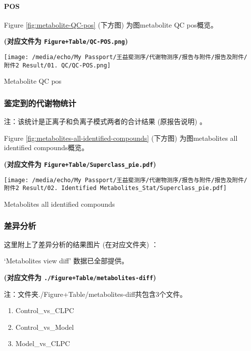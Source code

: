 \documentclass[
]{article}
\providecommand{\tightlist}{%
  \setlength{\itemsep}{0pt}\setlength{\parskip}{0pt}}
\begin{document}
\hypertarget{pos}{%
\paragraph{POS}\label{pos}}

Figure \ref{fig:metabolite-QC-pos} (下方图) 为图metabolite QC pos概览。

\textbf{(对应文件为 \texttt{Figure+Table/QC-POS.png})}

\def\@captype{figure}
\begin{center}
\texttt{[image: /media/echo/My Passport/王益斐测序/代谢物测序/报告与附件/报告及附件/附件2 Result/01. QC/QC-POS.png]}
\caption{Metabolite QC pos}\label{fig:metabolite-QC-pos}
\end{center}

\hypertarget{ux9274ux5b9aux5230ux7684ux4ee3ux8c22ux7269ux7edfux8ba1}{%
\subsubsection{鉴定到的代谢物统计}\label{ux9274ux5b9aux5230ux7684ux4ee3ux8c22ux7269ux7edfux8ba1}}

注：该统计是正离子和负离子模式两者的合计结果 (原报告说明) 。

Figure \ref{fig:metabolites-all-identified-compounds} (下方图) 为图metabolites all identified compounds概览。

\textbf{(对应文件为 \texttt{Figure+Table/Superclass\_pie.pdf})}

\def\@captype{figure}
\begin{center}
\texttt{[image: /media/echo/My Passport/王益斐测序/代谢物测序/报告与附件/报告及附件/附件2 Result/02. Identified Metabolites\_Stat/Superclass\_pie.pdf]}
\caption{Metabolites all identified compounds}\label{fig:metabolites-all-identified-compounds}
\end{center}

\hypertarget{ux5deeux5f02ux5206ux6790}{%
\subsubsection{差异分析}\label{ux5deeux5f02ux5206ux6790}}

这里附上了差异分析的结果图片 (在对应文件夹) ：

`Metabolites view diff' 数据已全部提供。

\textbf{(对应文件为 \texttt{./Figure+Table/metabolites-diff})}

\begin{center}\begin{tcolorbox}[colback=gray!10, colframe=gray!50, width=0.9\linewidth, arc=1mm, boxrule=0.5pt]注：文件夹./Figure+Table/metabolites-diff共包含3个文件。

\begin{enumerate}\tightlist
\item Control\_vs\_CLPC
\item Control\_vs\_Model
\item Model\_vs\_CLPC
\end{enumerate}\end{tcolorbox}
\end{center}
\end{document}
